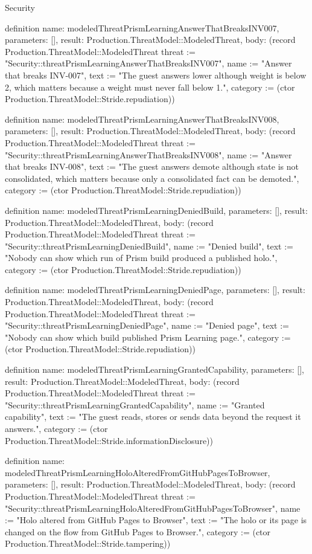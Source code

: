 \begin{lexlean}{Security}
\begin{semanticmodule}
definition{
  name: modeledThreatPrismLearningAnswerThatBreaksINV007,
  parameters: [],
  result: Production.ThreatModel::ModeledThreat,
  body: (record Production.ThreatModel::ModeledThreat {threat := "Security::threatPrismLearningAnswerThatBreaksINV007", name := "Answer that breaks INV-007", text := "The guest answers lower although weight is below 2, which matters because a weight must never fall below 1.", category := (ctor Production.ThreatModel::Stride.repudiation)})
}

definition{
  name: modeledThreatPrismLearningAnswerThatBreaksINV008,
  parameters: [],
  result: Production.ThreatModel::ModeledThreat,
  body: (record Production.ThreatModel::ModeledThreat {threat := "Security::threatPrismLearningAnswerThatBreaksINV008", name := "Answer that breaks INV-008", text := "The guest answers demote although state is not consolidated, which matters because only a consolidated fact can be demoted.", category := (ctor Production.ThreatModel::Stride.repudiation)})
}

definition{
  name: modeledThreatPrismLearningDeniedBuild,
  parameters: [],
  result: Production.ThreatModel::ModeledThreat,
  body: (record Production.ThreatModel::ModeledThreat {threat := "Security::threatPrismLearningDeniedBuild", name := "Denied build", text := "Nobody can show which run of Prism build produced a published holo.", category := (ctor Production.ThreatModel::Stride.repudiation)})
}

definition{
  name: modeledThreatPrismLearningDeniedPage,
  parameters: [],
  result: Production.ThreatModel::ModeledThreat,
  body: (record Production.ThreatModel::ModeledThreat {threat := "Security::threatPrismLearningDeniedPage", name := "Denied page", text := "Nobody can show which build published Prism Learning page.", category := (ctor Production.ThreatModel::Stride.repudiation)})
}

definition{
  name: modeledThreatPrismLearningGrantedCapability,
  parameters: [],
  result: Production.ThreatModel::ModeledThreat,
  body: (record Production.ThreatModel::ModeledThreat {threat := "Security::threatPrismLearningGrantedCapability", name := "Granted capability", text := "The guest reads, stores or sends data beyond the request it answers.", category := (ctor Production.ThreatModel::Stride.informationDisclosure)})
}

definition{
  name: modeledThreatPrismLearningHoloAlteredFromGitHubPagesToBrowser,
  parameters: [],
  result: Production.ThreatModel::ModeledThreat,
  body: (record Production.ThreatModel::ModeledThreat {threat := "Security::threatPrismLearningHoloAlteredFromGitHubPagesToBrowser", name := "Holo altered from GitHub Pages to Browser", text := "The holo or its page is changed on the flow from GitHub Pages to Browser.", category := (ctor Production.ThreatModel::Stride.tampering)})
}


\end{semanticmodule}
\end{lexlean}
